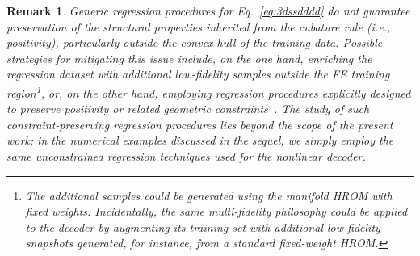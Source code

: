 \documentclass[11pt,a4paper]{article}
\newtheorem{remark}{Remark}
\begin{document}
\begin{remark}
Generic regression procedures for Eq.~\ref{eq:3dssdddd} do not guarantee
preservation of the structural properties inherited from the cubature rule (i.e.,   positivity), particularly   outside the convex hull of the training data. Possible strategies for
mitigating this issue include, on the one hand, enriching the regression
dataset with additional low-fidelity samples outside the FE training
region\footnote{The additional samples could be generated
  using the manifold HROM with fixed weights. Incidentally, the
same multi-fidelity philosophy could be applied to the decoder by augmenting its training
set with additional low-fidelity snapshots generated, for instance, from a
standard fixed-weight HROM.}, or, on the other hand,
employing regression procedures explicitly designed to preserve positivity
or related geometric constraints~\cite{pennec2006riemannian}.  The study of such
constraint-preserving regression procedures lies beyond the scope of the
present work; in the numerical examples discussed in the sequel, we simply
employ the same unconstrained regression techniques used for the nonlinear
decoder.
\end{remark}
\end{document}
